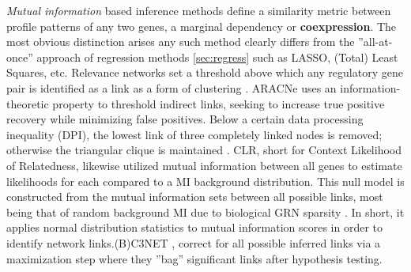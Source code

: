 \emph{Mutual information} based inference methods define a similarity metric between profile patterns of any two genes, a marginal dependency or \textbf{coexpression}. The most obvious distinction arises any such method clearly differs from the ''all-at-once'' approach of regression methods \cref{sec:regress} such as LASSO, (Total) Least Squares, etc. Relevance networks set a threshold above which any regulatory gene pair is identified as a link as a form of clustering \citep{faith2007large}. ARACNe uses an information-theoretic property to threshold indirect links, seeking to increase true positive recovery while minimizing false positives. Below a certain data processing inequality (DPI), the lowest link of three completely linked nodes is removed; otherwise the triangular clique is maintained \citep{montes2014aracne}. CLR, short for Context Likelihood of Relatedness, likewise utilized mutual information between all genes to estimate likelihoods for each compared to a MI background distribution. This null model is constructed from the mutual information sets between all possible links, most being that of random background MI due to biological GRN sparsity \citep{faith2007large}. In short, it applies normal distribution statistics to mutual information scores in order to identify network links.(B)C3NET \citep{altay2010inferring},\citep{de2012bagging} correct for all possible inferred links via a maximization step where they ''bag'' significant links after hypothesis testing.





